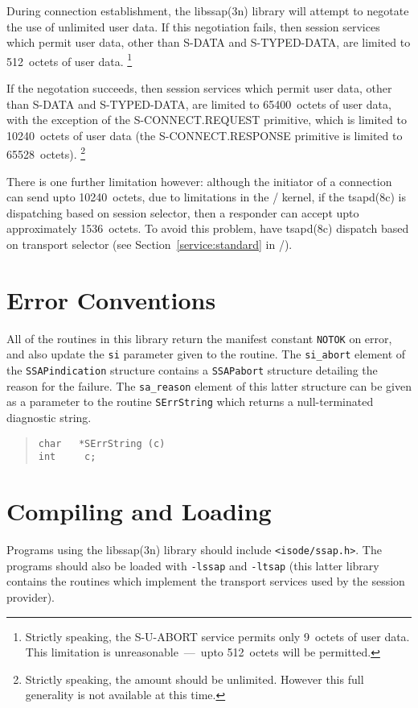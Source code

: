 During connection establishment,
the \man libssap(3n) library will attempt to negotate the use of unlimited
user data.
If this negotiation fails,
then session services which permit user data,
other than {\sf S-DATA\/} and {\sf S-TYPED-DATA},
are limited to 512~octets of user data.%
\footnote{Strictly speaking,
the {\sf S-U-ABORT} service permits only 9~octets of user data.
This limitation is unreasonable~---~upto 512~octets will be permitted.}

If the negotation succeeds,
then session services which permit user data,
other than {\sf S-DATA\/} and {\sf S-TYPED-DATA},
are limited to 65400~octets of user data,
with the exception of the {\sf S-CONNECT.REQUEST\/} primitive,
which is limited to 10240~octets of user data
(the {\sf S-CONNECT.RESPONSE\/} primitive is limited to 65528~octets).%
\footnote{Strictly speaking,
the amount should be unlimited.
However this full generality is not available at this time.}

There is one further limitation however:
although the initiator of a connection can send upto 10240~octets,
due to limitations in the \unix/ kernel,
if the \man tsapd(8c) is dispatching based on session selector,
then a responder can accept upto approximately 1536~octets.
To avoid this problem,
have \man tsapd(8c) dispatch based on transport selector
(see Section~\ref{service:standard} in \volone/).

\section	{Error Conventions}
All of the routines in this library return the manifest constant \verb"NOTOK"
on error,
and also update the \verb"si" parameter given to the routine.
The \verb"si_abort" element of the \verb"SSAPindication" structure contains a
\verb"SSAPabort" structure detailing the reason for the failure.
The \verb"sa_reason" element of this latter structure can be given as a
parameter to the routine \verb"SErrString" which returns a null-terminated
diagnostic string.
\begin{quote}\small\begin{verbatim}
char   *SErrString (c)
int     c;
\end{verbatim}\end{quote}

\section	{Compiling and Loading}
Programs using the \man libssap(3n) library should include
\verb"<isode/ssap.h>".
The programs should also be loaded with \verb"-lssap" and \verb"-ltsap"
(this latter library contains the routines which implement the transport
services used by the session provider).


